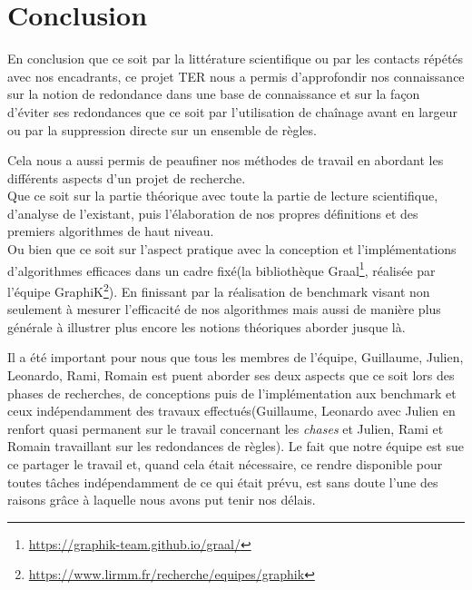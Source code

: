 \section{Conclusion}




\par En conclusion que ce soit par la littérature scientifique ou par les contacts répétés avec nos encadrants, ce projet TER nous a permis d'approfondir nos connaissance sur la notion de redondance dans une base de connaissance et sur la façon d'éviter ses redondances que ce soit par l'utilisation de chaînage avant en largeur ou par la suppression directe sur un ensemble de règles. 

\par Cela nous a aussi permis de peaufiner nos méthodes de travail en abordant les différents aspects d'un projet de recherche.\\ 
Que ce soit sur la partie théorique avec toute la partie de lecture scientifique, d'analyse de l'existant, puis l'élaboration de nos propres définitions et des premiers algorithmes de haut niveau.\\
Ou bien que ce soit sur l'aspect pratique avec la conception et l'implémentations d'algorithmes efficaces dans un cadre fixé(la bibliothèque Graal\footnote{\url{https://graphik-team.github.io/graal/}}, réalisée par l'équipe GraphiK\footnote{\url{https://www.lirmm.fr/recherche/equipes/graphik}}). En finissant par la réalisation de benchmark visant non seulement à mesurer l'efficacité de nos algorithmes mais aussi de manière plus générale à illustrer plus encore les notions théoriques aborder jusque là.

\par Il a été important pour nous que tous les membres de l'équipe, Guillaume, Julien, Leonardo, Rami, Romain est puent aborder ses deux aspects que ce soit lors des phases de recherches, de conceptions puis de l'implémentation aux benchmark et ceux indépendamment des travaux effectués(Guillaume, Leonardo avec Julien en renfort quasi permanent sur le travail concernant les \textit{chases} et Julien, Rami et Romain travaillant sur les redondances de règles). Le fait que notre équipe est sue ce partager le travail et, quand cela était nécessaire, ce rendre disponible pour toutes tâches indépendamment de ce qui était prévu, est sans doute l'une des raisons grâce à laquelle nous avons put tenir nos délais.

